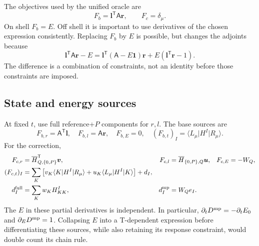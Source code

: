 \documentclass[11pt,letterpaper]{article}
\numberwithin{equation}{section}
\newcommand{\me}[3]{\langle #1\rvert #2\lvert #3\rangle}
\newcommand{\bH}{\overline H}
\newcommand{\T}{\mathsf T}
\begin{document}
The objectives used by the unified oracle are
\begin{equation}
 F_b=\bm l^{\T}\mathsf A\bm r,\qquad F_c=\delta_\mu.
 \label{eq:objectives}
\end{equation}
On shell $F_b=E$. Off shell it is important to use derivatives of the
chosen expression consistently. Replacing $F_b$ by $E$ is possible, but
changes the adjoints because
\begin{equation}
 \bm l^{\T}\mathsf A\bm r-E
 =\bm l^{\T}(\mathsf A-E\mathbf1)\bm r
                    +E(\bm l^{\T}\bm r-1).
 \label{eq:offshellequivalence}
\end{equation}
The difference is a combination of constraints, not an identity before
those constraints are imposed.

\subsection{State and energy sources}
At fixed $t$, use full reference+$P$ components for $r,l$. The base sources are
\begin{equation}
 F_{b,r}=\mathsf A^{\T}\bm l,\quad F_{b,l}=\mathsf A\bm r,
 \quad F_{b,E}=0,\quad (F_{b,t})_I=\me{L_\mu}{H^I}{R_\mu}.
 \label{eq:baseeomsources}
\end{equation}
For the correction,
\begin{align}
 F_{c,r}&=\bH_{Q,\{0,P\}}^{\T}\bm v,
 &F_{c,l}&=\bH_{\{0,P\},Q}\bm u,
 &F_{c,E}&=-W_Q,\\
 (F_{c,t})_I&=\sum_K\left[v_K\me{K}{H^I}{R_\mu}
       +u_K\me{L_\mu}{H^I}{K}\right]+d_I,\\
 d_I^{\rm full}&=\sum_Kw_K H^I_{KK},
 &d_I^{\rm mp}&=W_Q e_I.
 \label{eq:excsources}
\end{align}
The $E$ in these partial derivatives is independent. In particular,
$\partial_t D^{\rm mp}=-\partial_t E_0$ and
$\partial_E D^{\rm mp}=1$. Collapsing $E$ into a T-dependent expression
before differentiating these sources, while also retaining its response
constraint, would double count its chain rule.
\end{document}
